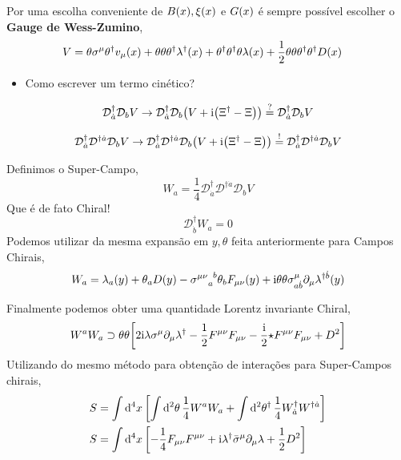 \documentclass{beamer}
\begin{document}
\begin{frame}
    Por uma escolha conveniente de $B\qty(x),\xi\qty(x)$ e $G\qty(x)$ é 
    sempre possível escolher o \textbf{Gauge de Wess-Zumino},
    \begin{align*}
        V&=\theta\sigma^\mu\theta^\dagger v_\mu\qty(x)+\theta\theta\theta^\dagger\lambda^\dagger\qty(x)
        +\theta^\dagger\theta^\dagger\theta\lambda\qty(x)+\frac12\theta\theta\theta^\dagger\theta^\dagger D\qty(x)
    \end{align*}
    \begin{itemize}
        \item Como escrever um termo cinético?
    \end{itemize}

    \pause\[\mathcal D^\dagger_{\dot a}\mathcal D_b V\rightarrow\mathcal D^\dagger_{\dot a}\mathcal D_b\qty(V+\textnormal{i}\qty(\Xi^\dagger-\Xi))\stackrel{?}{=}\mathcal D^\dagger_{\dot a}\mathcal D_bV\]

    \pause\[\mathcal D^\dagger_{\dot a}\mathcal D^{\dagger\dot a}\mathcal D_b V\rightarrow\mathcal D^\dagger_{\dot a}\mathcal D^{\dagger\dot a}\mathcal D_b\qty(V+\textnormal{i}\qty(\Xi^\dagger-\Xi))\stackrel{!}{=}\mathcal D^\dagger_{\dot a}\mathcal D^{\dagger\dot a}\mathcal D_bV\]
\end{frame}

\begin{frame}
    Definimos o Super-Campo,
    \[W_a=\frac14\mathcal D^\dagger_{\dot a}\mathcal D^{\dagger\dot a}\mathcal D_b V\]
    Que é de fato Chiral!
    \[\mathcal D^\dagger_{\dot b}W_a=0\]
    Podemos utilizar da mesma expansão em $y,\theta$ feita anteriormente para Campos Chirais,
    \[W_a=\lambda_a\qty(y)+\theta_a D\qty(y)-\tensor{{\sigma^{\mu\nu}}}{_a^b}\theta_bF_{\mu\nu}\qty(y)+\im\theta\theta\sigma^\mu_{a\dot b}\partial_\mu\lambda^{\dagger \dot b}\qty(y)\]
\end{frame}

\begin{frame}
    Finalmente podemos obter uma quantidade Lorentz invariante Chiral,
    \[W^aW_a\supset\theta\theta\qty[2\textnormal{i}\lambda\sigma^\mu\partial_\mu\lambda^\dagger-\frac12F^{\mu\nu}F_{\mu\nu}-\frac{\textnormal{i}}2{\star} F^{\mu\nu}F_{\mu\nu}+D^2]\]
    Utilizando do mesmo método para obtenção de interações para Super-Campos chirais,
    \begin{align*}
        S&=\int\dd[4]{x}\qty[\int\dd[2]{\theta}\frac14W^aW_a+\int\dd[2]{\theta^\dagger}\frac14W^\dagger_{\dot a}W^{\dagger\dot a}]\\
        S&=\int\dd[4]{x}\qty[-\frac14 F_{\mu\nu}F^{\mu\nu}+\textnormal{i}\lambda^\dagger{\bar\sigma}^\mu\partial_\mu\lambda+\frac12D^2]
    \end{align*}
\end{frame}
\end{document}
